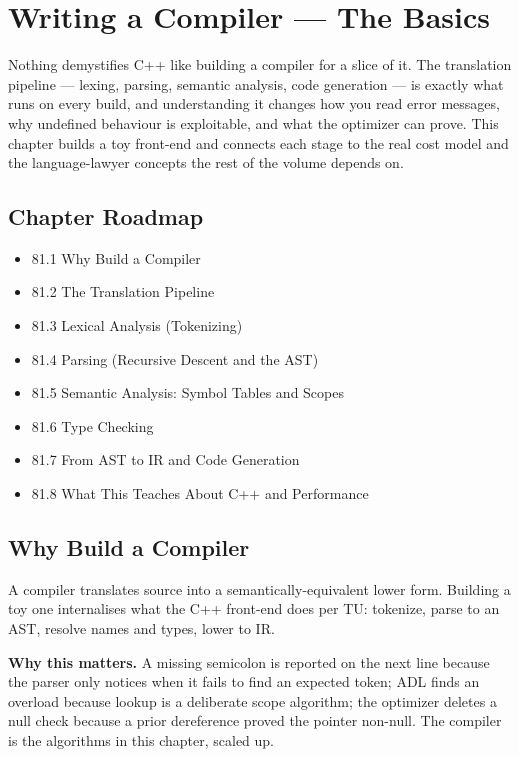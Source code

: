 \chapter{Writing a Compiler --- The Basics}

Nothing demystifies C++ like building a compiler for a slice of it. The translation pipeline --- lexing, parsing, semantic analysis, code generation --- is exactly what runs on every build, and understanding it changes how you read error messages, why undefined behaviour is exploitable, and what the optimizer can prove. This chapter builds a toy front-end and connects each stage to the real cost model and the language-lawyer concepts the rest of the volume depends on.

\section*{Chapter Roadmap}
\begin{itemize}
\item 81.1 Why Build a Compiler
\item 81.2 The Translation Pipeline
\item 81.3 Lexical Analysis (Tokenizing)
\item 81.4 Parsing (Recursive Descent and the AST)
\item 81.5 Semantic Analysis: Symbol Tables and Scopes
\item 81.6 Type Checking
\item 81.7 From AST to IR and Code Generation
\item 81.8 What This Teaches About C++ and Performance
\end{itemize}

\section{Why Build a Compiler}
A compiler translates source into a semantically-equivalent lower form. Building a toy one internalises what the C++ front-end does per TU: tokenize, parse to an AST, resolve names and types, lower to IR.

\textbf{Why this matters.} A missing semicolon is reported on the next line because the parser only notices when it fails to find an expected token; ADL finds an overload because lookup is a deliberate scope algorithm; the optimizer deletes a null check because a prior dereference proved the pointer non-null. The compiler is the algorithms in this chapter, scaled up.

